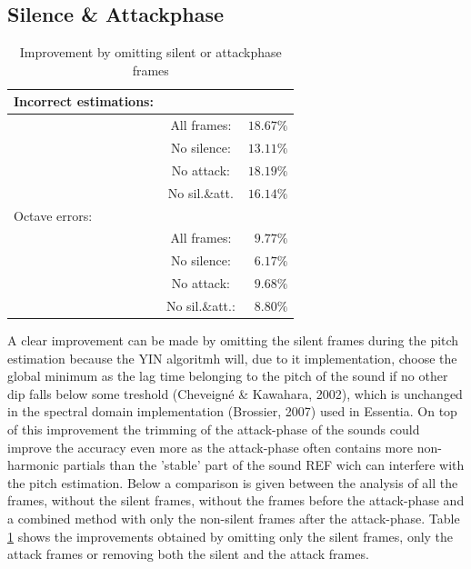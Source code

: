 \documentclass{proc}
\begin{document}
\subsection{Silence \& Attackphase}
\begin{table}[h]
    \begin{center}
        \begin{tabular}{ | l | c | r |}
            \hline
            Incorrect estimations:  &                   &               \\  \hline
                                    &   All frames:     &   $18.67\%$   \\  \hline
                                    &   No silence:     &   $13.11\%$    \\  \hline
                                    &   No attack:      &   $18.19\%$    \\  \hline
                                    &   No sil.\&att.   &   $16.14\%$    \\  \hline
            Octave errors:      &                   &               \\  \hline
                                &   All frames:     &   $9.77\%$   \\  \hline
                                &   No silence:     &   $6.17\%$   \\  \hline
                                &   No attack:      &   $9.68\%$   \\  \hline
                                &   No sil.\&att.:  &   $8.80\%$   \\  \hline
        \end{tabular}
        \caption{Improvement by omitting silent or attackphase frames}
        \label{table:impr_sil}
    \end{center}
\end{table}
A clear improvement can be made by omitting the silent frames during the pitch estimation because the YIN algoritmh will, due to it implementation, choose the global minimum as the lag time belonging to the pitch of the sound if no other dip falls below some treshold (Cheveigné \& Kawahara, 2002), which is unchanged in the spectral domain implementation (Brossier, 2007) used in Essentia. On top of this improvement the trimming of the attack-phase of the sounds could improve the accuracy even more as the attack-phase often contains more non-harmonic partials than the 'stable' part of the sound REF wich can interfere with the pitch estimation. Below a comparison is given between the analysis of all the frames, without the silent frames, without the frames before the attack-phase and a combined method with only the non-silent frames after the attack-phase. Table \ref{table:impr_sil} shows the improvements obtained by omitting only the silent frames, only the attack frames or removing both the silent and the attack frames.
\end{document}
